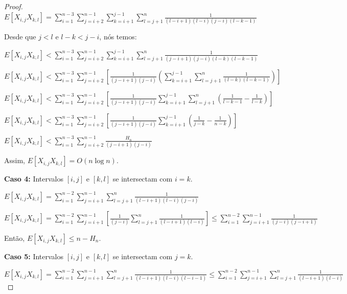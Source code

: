 \documentclass[dissertacao, brazil]{ThesisPUC}
\begin{document}
\begin{proof}
$E[X_{i,j} X_{k,l}] = \sum\limits_{i=1}^{n-3} \sum\limits_{j=i+2}^{n-1}
\sum\limits_{k=i+1}^{j-1} \sum\limits_{l=j+1}^{n} \frac{1}{(l-i+1)(l-i)(j-i)(l-k-1)}$


Desde que $j < l$ e $ l - k < j - i$, nós temos:

$E[X_{i,j} X_{k,l}] < \sum\limits_{i=1}^{n-3} \sum\limits_{j=i+2}^{n-1}
\sum\limits_{k=i+1}^{j-1} \sum\limits_{l=j+1}^{n} \frac{1}{(j-i+1)(j-i)(l-k)(l-k-1)}$

$E[X_{i,j} X_{k,l}] < \sum\limits_{i=1}^{n-3} \sum\limits_{j=i+2}^{n-1}
\left[ \frac{1}{(j-i+1)(j-i)}  \left( \sum\limits_{k=i+1}^{j-1} \sum\limits_{l=j+1}^{n} \frac{1}{(l-k)(l-k-1)} \right) \right]$

$E[X_{i,j} X_{k,l}] < \sum\limits_{i=1}^{n-3} \sum\limits_{j=i+2}^{n-1}
\left[ \frac{1}{(j-i+1)(j-i)}  \sum\limits_{k=i+1}^{j-1} \sum\limits_{l=j+1}^{n}  \left(  \frac{1}{l-k-1} - \frac{1}{l-k}  \right) \right]$

$E[X_{i,j} X_{k,l}] < \sum\limits_{i=1}^{n-3} \sum\limits_{j=i+2}^{n-1}
\left[ \frac{1}{(j-i+1)(j-i)}  \sum\limits_{k=i+1}^{j-1}  \left(  \frac{1}{j-k} - \frac{1}{n-k}  \right) \right]$

$E[X_{i,j} X_{k,l}] < \sum\limits_{i=1}^{n-3} \sum\limits_{j=i+2}^{n-1}
\frac{H_{n}}{(j-i+1)(j-i)} $

Assim, $E[X_{i,j} X_{k,l}] = O(n \log n)$.

\vspace{0.5cm}

{\bf Caso 4:} Intervalos $[i, j]$ e $[k, l]$ se intersectam com $i = k$.

$E[X_{i,j} X_{k,l}] = \sum\limits_{i=1}^{n-2}
\sum\limits_{j=i+1}^{n-1} \sum\limits_{l=j+1}^{n} \frac{1}{(l-i+1)(l-i)(j-i)}$

$E[X_{i,j} X_{k,l}] = \sum\limits_{i=1}^{n-2}
\sum\limits_{j=i+1}^{n-1} \left[ \frac{1}{(j-i)} \sum\limits_{l=j+1}^{n} \frac{1}{(l-i+1)(l-i)} \right]
\leq \sum\limits_{i=1}^{n-2}
\sum\limits_{j=i+1}^{n-1} \frac{1}{(j-i)(j-i+1)}$

Então, $E[X_{i,j} X_{k,l}] \leq n - H_{n}$.

\vspace{0.5cm}

{\bf Caso 5:} Intervalos $[i, j]$ e $[k, l]$ se intersectam com $j = k$.

$E[X_{i,j} X_{k,l}] = \sum\limits_{i=1}^{n-2}
\sum\limits_{j=i+1}^{n-1} \sum\limits_{l=j+1}^{n} \frac{1}{(l-i+1)(l-i)(l-i-1)}
\leq \sum\limits_{i=1}^{n-2}
\sum\limits_{j=i+1}^{n-1} \sum\limits_{l=j+1}^{n} \frac{1}{(l-i+1)(l-i)}
$


\end{proof}
\end{document}
